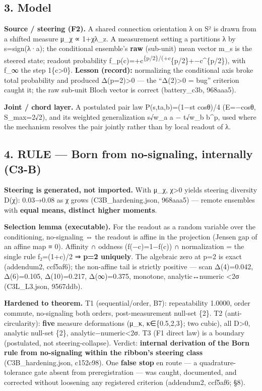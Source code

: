 \documentclass[
  11pt]{article}
\begin{document}
\subsection{3. Model}\label{model}

\textbf{Source / steering (F2).} A shared connection orientation λ on S²
is drawn from a shifted measure μ\_χ ∝ 1+χλ\_z. A measurement setting a
partitions λ by s=sign(λ·a); the conditional ensemble's \textbf{raw}
(sub-unit) mean vector m\_s is the steered state; readout probability
f\_p(c)=+c\textbar{}\textsuperscript{\{p/2\}/(+c\textbar{}}\{p/2\}+−c\textbar\^{}\{p/2\}),
with f\_∞ the step 1\{c\textgreater0\}. \textbf{Lesson (record):}
normalizing the conditional axis broke total probability and produced
Δ(p=2)\textgreater0 --- the ``Δ(2)\textgreater0 = bug'' criterion caught
it; the raw sub-unit Bloch vector is correct (battery\_c3b, 968aaa5).

\textbf{Joint / chord layer.} A postulated pair law
P(s,t\textbar a,b)=(1−st cosθ)/4 (E=−cosθ, S\_max=2√2), and its weighted
generalization \textbar s√w\_a a − t√w\_b b\textbar\^{}p, used where the
mechanism resolves the pair jointly rather than by local readout of λ.

\subsection{4. RULE --- Born from no-signaling, internally
(C3-B)}\label{rule-born-from-no-signaling-internally-c3-b}

\textbf{Steering is generated, not imported.} With μ\_χ, χ\textgreater0
yields steering diversity D(χ): 0.03→0.08 as χ grows
(C3B\_hardening.json, 968aaa5) --- remote ensembles with \textbf{equal
means, distinct higher moments}.

\textbf{Selection lemma (executable).} For the readout as a random
variable over the conditioning, no-signaling ⇔ the readout is affine in
the projection (Jensen gap of an affine map ≡ 0). Affinity ∩ oddness
(f(−c)=1−f(c)) ∩ normalization = the single rule f₂=(1+c)/2 ⇒
\textbf{p=2 uniquely}. The algebraic zero at p=2 is exact (addendum2,
ccf5af6); the non-affine tail is strictly positive --- scan Δ(4)=0.042,
Δ(6)=0.105, Δ(10)=0.217, Δ(∞)=0.375, monotone, analytic↔numeric
\textless2σ (C3L\_L3.json, 9567ddb).

\textbf{Hardened to theorem.} T1 (sequential/order, B7): repeatability
1.0000, order commute, no-signaling both orders, post-measurement
null-set \{2\}. T2 (anti-circularity): \textbf{five} measure
deformations (μ\_κ, κ∈\{0.5,2,3\}; two cubic), all D\textgreater0,
analytic null-set \{2\}, \textbar analytic−numeric\textbar\textless2σ.
T3 (F1 direct law) is a boundary (postulated, not steering-collapse).
Verdict: \textbf{internal derivation of the Born rule from no-signaling
within the ribbon's steering class} (C3B\_hardening.json, c152c98). One
\textbf{false stop} en route --- a quadrature-tolerance gate absent from
preregistration --- was caught, documented, and corrected without
loosening any registered criterion (addendum2, ccf5af6; §8).
\end{document}
